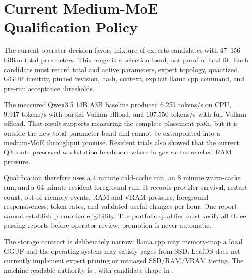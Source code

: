 \documentclass[11pt]{article}
\begin{document}
\section{Current Medium-MoE Qualification Policy}

The current operator decision favors mixture-of-experts candidates with 47--156 billion total parameters. This range is a selection band, not proof of host fit. Each candidate must record total and active parameters, expert topology, quantized GGUF identity, pinned revision, hash, context, explicit llama.cpp command, and pre-run acceptance thresholds.

The measured Qwen3.5 14B A3B baseline produced 6.259 tokens/s on CPU, 9.917 tokens/s with partial Vulkan offload, and 107.550 tokens/s with full Vulkan offload. That result supports measuring the complete placement path, but it is outside the new total-parameter band and cannot be extrapolated into a medium-MoE throughput promise. Resident trials also showed that the current Q3 route preserved workstation headroom where larger routes reached RAM pressure.

Qualification therefore uses a 4 minute cold-cache run, an 8 minute warm-cache run, and a 64 minute resident-foreground run. It records provider survival, restart count, out-of-memory events, RAM and VRAM pressure, foreground responsiveness, token rates, and validated useful changes per hour. One report cannot establish promotion eligibility. The portfolio qualifier must verify all three passing reports before operator review; promotion is never automatic.

The storage contract is deliberately narrow: llama.cpp may memory-map a local GGUF and the operating system may satisfy pages from SSD. LeafOS does not currently implement expert pinning or managed SSD/RAM/VRAM tiering. The machine-readable authority is , with candidate shape in .
\end{document}
